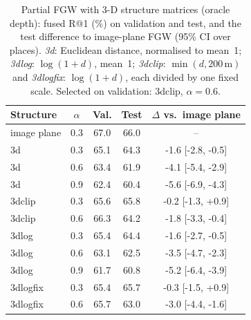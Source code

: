 \begin{table}[t]
\centering
\footnotesize
\setlength{\tabcolsep}{3pt}
\caption{Partial FGW with 3-D structure matrices (oracle depth): fused R@1 (\%) on validation and test, and the test difference to image-plane FGW (95\% CI over places). \emph{3d}: Euclidean distance, normalised to mean~1; \emph{3dlog}: $\log(1+d)$, mean~1; \emph{3dclip}: $\min(d,200\,\mathrm{m})$ and \emph{3dlogfix}: $\log(1+d)$, each divided by one fixed scale. Selected on validation: 3dclip, $\alpha=0.6$.}
\label{tab:fgw3d}
\begin{tabular}{@{}lcccc@{}}
\toprule
Structure & $\alpha$ & Val. & Test & $\Delta$ vs.\ image plane \\
\midrule
image plane & 0.3 & 67.0 & 66.0 & -- \\
3d & 0.3 & 65.1 & 64.3 & -1.6 [-2.8, -0.5] \\
3d & 0.6 & 63.4 & 61.9 & -4.1 [-5.4, -2.9] \\
3d & 0.9 & 62.4 & 60.4 & -5.6 [-6.9, -4.3] \\
3dclip & 0.3 & 65.6 & 65.8 & -0.2 [-1.3, +0.9] \\
3dclip & 0.6 & 66.3 & 64.2 & -1.8 [-3.3, -0.4] \\
3dlog & 0.3 & 65.4 & 64.4 & -1.6 [-2.7, -0.5] \\
3dlog & 0.6 & 63.1 & 62.5 & -3.5 [-4.7, -2.3] \\
3dlog & 0.9 & 61.7 & 60.8 & -5.2 [-6.4, -3.9] \\
3dlogfix & 0.3 & 65.4 & 65.7 & -0.3 [-1.5, +0.9] \\
3dlogfix & 0.6 & 65.7 & 63.0 & -3.0 [-4.4, -1.6] \\
\bottomrule
\end{tabular}
\end{table}

